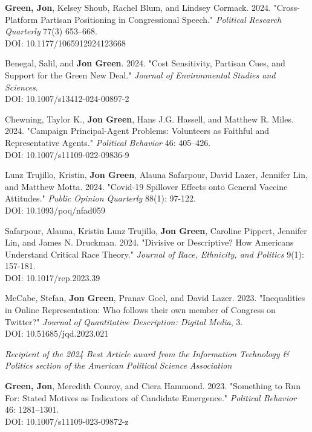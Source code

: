 \documentclass[letterpaper]{article}
\renewenvironment{itemize}{
  \begin{list}{}{
    \setlength{\leftmargin}{1.5em}
  }
}{
  \end{list}
}
\begin{document}
\begin{etaremune}
\item \textbf{Green, Jon}, Kelsey Shoub, Rachel Blum, and Lindsey Cormack. 2024. "Cross-Platform Partisan Positioning in Congressional Speech." \textit{Political Research Quarterly} 77(3) 653–668. \\
DOI: 10.1177/1065912924123668

\item Benegal, Salil, and \textbf{Jon Green}. 2024. "Cost Sensitivity, Partisan Cues, and Support for the Green New Deal." \textit{Journal of Environmental Studies and Sciences}. \\
DOI: 10.1007/s13412-024-00897-2

\item Chewning, Taylor K., \textbf{Jon Green}, Hans J.G. Hassell, and Matthew R. Miles. 2024. "Campaign Principal-Agent Problems: Volunteers as Faithful and Representative Agents." \textit{Political Behavior} 46: 405–426. \\
DOI: 10.1007/s11109-022-09836-9

\item Lunz Trujillo, Kristin, \textbf{Jon Green}, Alauna Safarpour, David Lazer, Jennifer Lin, and Matthew Motta. 2024. "Covid-19 Spillover Effects onto General Vaccine Attitudes." \textit{Public Opinion Quarterly} 88(1): 97-122.\\
DOI: 10.1093/poq/nfad059

\item Safarpour, Alauna, Kristin Lunz Trujillo, \textbf{Jon Green}, Caroline Pippert, Jennifer Lin, and James N. Druckman. 2024. "Divisive or Descriptive? How Americans Understand Critical Race Theory." \textit{Journal of Race, Ethnicity, and Politics} 9(1): 157-181. \\
DOI: 10.1017/rep.2023.39

\item McCabe, Stefan, \textbf{Jon Green}, Pranav Goel, and David Lazer. 2023. "Inequalities in Online Representation: Who follows their own member of Congress on Twitter?" \textit{Journal of Quantitative Description: Digital Media}, 3. \\
DOI: 10.51685/jqd.2023.021
\begin{itemize}
\item \textit{Recipient of the 2024 Best Article award from the Information Technology \& Politics section of the American Political Science Association}
\end{itemize}

\item \textbf{Green, Jon}, Meredith Conroy, and Ciera Hammond. 2023. "Something to Run For: Stated Motives as Indicators of Candidate Emergence." \textit{Political Behavior} 46: 1281–1301.\\
DOI: 10.1007/s11109-023-09872-z


\end{etaremune}
\end{document}

